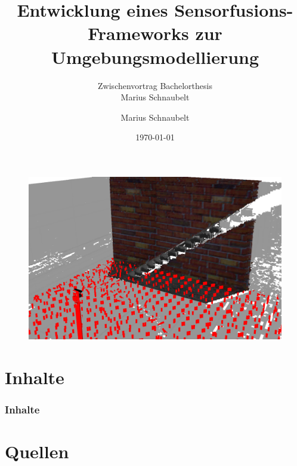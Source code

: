 \documentclass[accentcolor=tud1b,colorbacktitle,inverttitle,landscape,german,
presentation]{tudbeamer}
\begin{document}
  
  \title[]{Entwicklung eines Sensorfusions-Frameworks zur Umgebungsmodellierung}
  \subtitle{Zwischenvortrag Bachelorthesis\\
  Marius Schnaubelt}
  
  \author[M. Schnaubelt]{Marius Schnaubelt}
  
  
  \date{\today}
  
  \begin{titleframe}
    \begin{figure}[htbp] 
      \centering
      
      \includegraphics[height=0.45\textwidth]{images/mason_trim} 
      
    \end{figure}
  \end{titleframe}
  
  \section*{Inhalte}
  
  \begin{frame}
    \frametitle{Inhalte}
    \small{\tableofcontents}
  \end{frame}
  
  
  
  
   
  
   

  \section*{Quellen}
\end{document}
